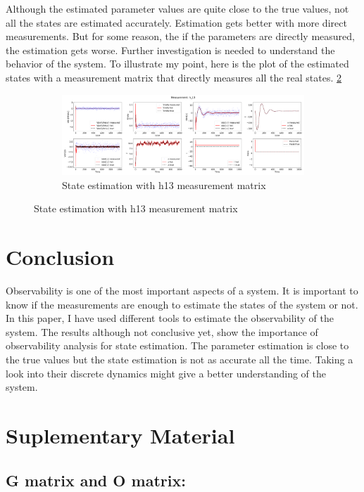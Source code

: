 \documentclass[12pt]{article}
\begin{document}
Although the estimated parameter values are quite close to the true values, not all the states are estimated accurately. Estimation gets better with more direct measurements. But for some reason, the if the parameters are directly measured, the estimation gets worse. Further investigation is needed to understand the behavior of the system. To illustrate my point, here is the plot of the estimated states with a measurement matrix that directly measures all the real states. \ref{fig:05d}

\begin{figure}[H]
    \begin{subfigure}[t]{\textwidth}
        \centering
        \includegraphics[width=15cm]{figures/ekf_with_noisy_sinusoidal_x_and_h13.png}
        \caption{State estimation with h13 measurement matrix}
        \label{fig:05d}
    \end{subfigure}
\end{figure}


\section*{Conclusion}
Observability is one of the most important aspects of a system. It is important to know if the measurements are enough to estimate the states of the system or not. In this paper, I have used different tools to estimate the observability of the system. The results although not conclusive yet, show the importance of observability analysis for state estimation. The parameter estimation is close to the true values but the state estimation is not as accurate all the time. Taking a look into their discrete dynamics might give a better understanding of the system.

\pagebreak




\section*{Suplementary Material}
\subsection*{G matrix and O matrix:}
\end{document}
